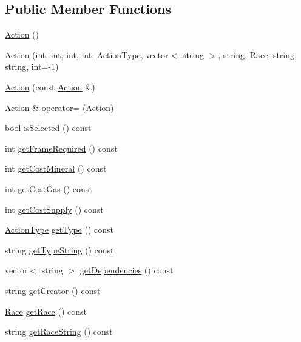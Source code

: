 \subsection*{Public Member Functions}
\begin{DoxyCompactItemize}
\item 
\hyperlink{classghost_1_1Action_a82c7d6aec3d39fd036395fcf563fd2c5}{Action} ()
\item 
\hyperlink{classghost_1_1Action_a689772909dd44aed12c89150b2728a2f}{Action} (int, int, int, int, \hyperlink{namespaceghost_a7c0deb8266504feb7d025903f2b77693}{Action\-Type}, vector$<$ string $>$, string, \hyperlink{namespaceghost_a8b1db75c40c6980adcf244ddccc0324b}{Race}, string, string, int=-\/1)
\item 
\hyperlink{classghost_1_1Action_af83e86975dc608cb9ebe7447fa2b368a}{Action} (const \hyperlink{classghost_1_1Action}{Action} \&)
\item 
\hyperlink{classghost_1_1Action}{Action} \& \hyperlink{classghost_1_1Action_a56179a064666c0b895daa0006ebe26d1}{operator=} (\hyperlink{classghost_1_1Action}{Action})
\item 
bool \hyperlink{classghost_1_1Action_a3a9c93b2d9ba2181e74fddceaec84a34}{is\-Selected} () const 
\item 
int \hyperlink{classghost_1_1Action_a4f0d5d2692392c695342c3a6ae3bb516}{get\-Frame\-Required} () const 
\item 
int \hyperlink{classghost_1_1Action_ad8f83b004d632ef058e2aced097af7f0}{get\-Cost\-Mineral} () const 
\item 
int \hyperlink{classghost_1_1Action_a46881c65b49922ee92afa96ac2c38d17}{get\-Cost\-Gas} () const 
\item 
int \hyperlink{classghost_1_1Action_ae1f8a3db9caafbcaa2039600f11eafd7}{get\-Cost\-Supply} () const 
\item 
\hyperlink{namespaceghost_a7c0deb8266504feb7d025903f2b77693}{Action\-Type} \hyperlink{classghost_1_1Action_a3d80b97f17c4e29a23a19962d8adfaa6}{get\-Type} () const 
\item 
string \hyperlink{classghost_1_1Action_a806f43d37dfd110a1ed88e643db9845d}{get\-Type\-String} () const 
\item 
vector$<$ string $>$ \hyperlink{classghost_1_1Action_a8396f1b683a8d6a20c5007aab5e1c02b}{get\-Dependencies} () const 
\item 
string \hyperlink{classghost_1_1Action_a7e9e96cdfbc4ed561d782d2af51fb1ab}{get\-Creator} () const 
\item 
\hyperlink{namespaceghost_a8b1db75c40c6980adcf244ddccc0324b}{Race} \hyperlink{classghost_1_1Action_a67245bd8400e2dc6db7f16b512df145d}{get\-Race} () const 
\item 
string \hyperlink{classghost_1_1Action_ab22270eb1800b12ca2d2d6259552d974}{get\-Race\-String} () const 
\end{DoxyCompactItemize}
